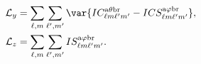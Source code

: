 \vspace{-0.8cm}
\begin{align} 
\mathcal{L}_y &= 
\sum_{\ell, m} \sum_{\ell^{\prime}, m^{\prime}}
\var{IC_{\ell m \ell^{\prime} m^{\prime}}^{\rm a \theta b r} - 
ICS_{\ell m \ell^{\prime} m^{\prime}}^{\rm a \varphi b r}}, \label{eq: Ly spectral integral angles solved} \\
%
\mathcal{L}_z &= 
\sum_{\ell, m} \sum_{\ell^{\prime}, m^{\prime}}
IS_{\ell m \ell^{\prime} m^{\prime}}^{\rm a \varphi b r}. \label{eq: Lz spectral integral angles solved}
\end{align}
%
